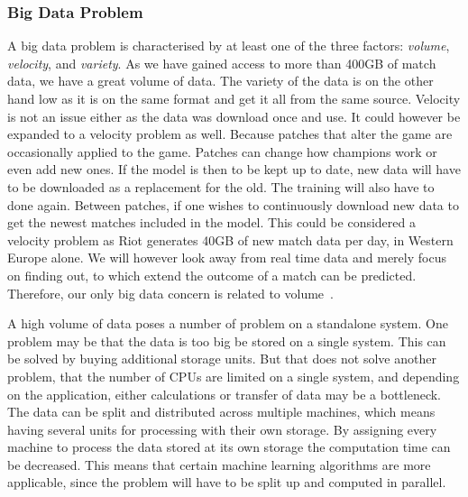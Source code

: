 \subsubsection{Big Data Problem}\label{sec:big_data_problem}
A big data problem is characterised by at least one of the three factors: \emph{volume}, \emph{velocity}, and \emph{variety}. As we have gained access to more than 400GB of match data, we have a great volume of data. The variety of the data is on the other hand low as it is on the same format and get it all from the same source. Velocity is not an issue either as the data was download once and use. It could however be expanded to a velocity problem as well. Because patches that alter the game are occasionally applied to the game. Patches can change how champions work or even add new ones. If the model is then to be kept up to date, new data will have to be downloaded as a replacement for the old. The training will also have to done again. Between patches, if one wishes to continuously download new data to get the newest matches included in the model. This could be considered a velocity problem as Riot generates 40GB of new match data per day, in Western Europe alone. We will however look away from real time data and merely focus on finding out, to which extend the outcome of a match can be predicted. Therefore, our only big data concern is related to volume~\cite{madden2012databases}.

A high volume of data poses a number of problem on a standalone system. One problem may be that the data is too big be stored on a single system.
This can be solved by buying additional storage units. But that does not solve another problem, that the number of CPUs are limited on a single system, and depending on the application, either calculations or transfer of data may be a bottleneck.
The data can be split and distributed across multiple machines, which means having several units for processing with their own storage. By assigning every machine to process the data stored at its own storage the computation time can be decreased.
This means that certain machine learning algorithms are more applicable, since the problem will have to be split up and computed in parallel. 
